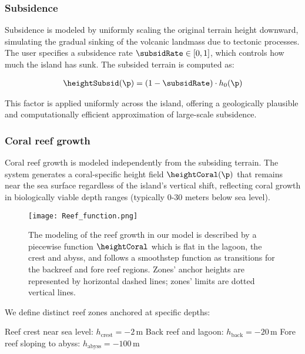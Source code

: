 \subsubsection{Subsidence}
\label{sec:coral-island_subsidence}

Subsidence is modeled by uniformly scaling the original terrain height downward, simulating the gradual sinking of the volcanic landmass due to tectonic processes. The user specifies a subsidence rate $\subsidRate \in [0, 1]$, which controls how much the island has sunk. The subsided terrain is computed as:

\begin{align}
    \heightSubsid(\p) = (1 - \subsidRate) \cdot h_0(\p)
\end{align}

This factor is applied uniformly across the island, offering a geologically plausible and computationally efficient approximation of large-scale subsidence.

\subsubsection{Coral reef growth}
\label{sec:coral-island_reef-growth}

Coral reef growth is modeled independently from the subsiding terrain. The system generates a coral-specific height field $\heightCoral(\p)$ that remains near the sea surface regardless of the island's vertical shift, reflecting coral growth in biologically viable depth ranges (typically 0-30 meters below sea level).

\begin{figure}
    \texttt{[image: Reef\_function.png]}
    \caption{The modeling of the reef growth in our model is described by a piecewise function $\heightCoral$ which is flat in the lagoon, the crest and abyss, and follows a smoothstep function as transitions for the backreef and fore reef regions. Zones' anchor heights are represented by horizontal dashed lines; zones' limits are dotted vertical lines. }
    \label{fig:coral-island_reef-function}
\end{figure}

We define distinct reef zones anchored at specific depths:
\begin{Itemize}
    \Item{} Reef crest near sea level: $h_\text{crest} = -2$\,m
    \Item{} Back reef and lagoon: $h_\text{back} = -20$\,m
    \Item{} Fore reef sloping to abyss: $h_\text{abyss} = -100$\,m
\end{Itemize}

